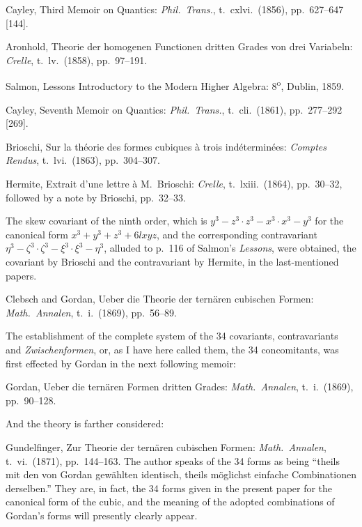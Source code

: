 \documentclass[11pt,a4paper]{article}
\begin{document}
\smallskip
\noindent
Cayley, Third Memoir on Quantics: \textit{Phil.\ Trans.}, t.~cxlvi.\ (1856),
pp.\ 627--647 [144].

\smallskip
\noindent
Aronhold, Theorie der homogenen Functionen dritten Grades von drei
Variabeln: \textit{Crelle}, t.~lv.\ (1858), pp.\ 97--191.

\smallskip
\noindent
Salmon, Lessons Introductory to the Modern Higher Algebra: 8\textsuperscript{o},
Dublin, 1859.

\smallskip
\noindent
Cayley, Seventh Memoir on Quantics: \textit{Phil.\ Trans.}, t.~cli.\ (1861),
pp.\ 277--292 [269].

\smallskip
\noindent
Brioschi, Sur la th\'eorie des formes cubiques \`a trois
ind\'etermin\'ees: \textit{Comptes Rendus}, t.~lvi.\ (1863), pp.\ 304--307.

\newpage
\noindent
Hermite, Extrait d'une lettre \`a M.~Brioschi: \textit{Crelle},
t.~lxiii.\ (1864), pp.\ 30--32, followed by a note by Brioschi, pp.\ 32--33.

The skew covariant of the ninth order, which is
$y^{3}-z^{3}\cdot z^{3}-x^{3}\cdot x^{3}-y^{3}$ for the canonical form
$x^{3}+y^{3}+z^{3}+6lxyz$, and the corresponding contravariant
$\eta^{3}-\zeta^{3}\cdot\zeta^{3}-\xi^{3}\cdot\xi^{3}-\eta^{3}$, alluded
to p.~116 of Salmon's \textit{Lessons}, were obtained, the covariant by
Brioschi and the contravariant by Hermite, in the last-mentioned papers.

\smallskip
\noindent
Clebsch and Gordan, Ueber die Theorie der tern\"aren cubischen Formen:
\textit{Math.\ Annalen}, t.~i.\ (1869), pp.\ 56--89.

The establishment of the complete system of the 34 covariants,
contravariants and \textit{Zwischenformen}, or, as I have here called
them, the 34 concomitants, was first effected by Gordan in the next
following memoir:

\smallskip
\noindent
Gordan, Ueber die tern\"aren Formen dritten Grades: \textit{Math.\
Annalen}, t.~i.\ (1869), pp.\ 90--128.

And the theory is farther considered:

\smallskip
\noindent
Gundelfinger, Zur Theorie der tern\"aren cubischen Formen:
\textit{Math.\ Annalen}, t.~vi.\ (1871), pp.\ 144--163. The author
speaks of the 34 forms as being ``theils mit den von Gordan gew\"ahlten
identisch, theils m\"oglichst einfache Combinationen derselben.'' They
are, in fact, the 34 forms given in the present paper for the canonical
form of the cubic, and the meaning of the adopted combinations of
Gordan's forms will presently clearly appear.
\end{document}
